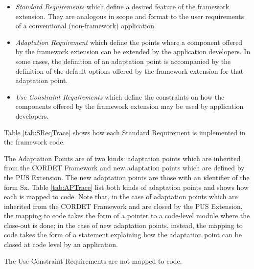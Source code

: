 \documentclass{pnp_article}
\begin{document}
\begin{itemize}
\item{} \textit{Standard Requirements} which define a desired feature of the framework extension. They are analogous in scope and format to the user requirements of a conventional (non-framework) application.
\item{} \textit{Adaptation Requirement} which define the points where a component offered by the framework extension can be extended by the application developers. In some cases, the definition of an adaptation point is accompanied by the definition of the default options offered by the framework extension for that adaptation point.  
\item{} \textit{Use Constraint Requirements} which define the constraints on how the components offered by the framework extension may be used by application developers.
\end{itemize}

Table \ref{tab:SReqTrace} shows how each Standard Requirement is implemented in the framework code. 

The Adaptation Points are of two kinds: adaptation points which are inherited from the CORDET Framework and new adaptation points which are defined by the PUS Extension. The new adaptation points are those with an identifier of the form Sx. Table \ref{tab:APTrace} list both kinds of adaptation points and shows how each is mapped to code. Note that, in the case of adaptation points which are inherited from the CORDET Framework and are closed by the PUS Extension, the mapping to code takes the form of a pointer to a code-level module where the close-out is done; in the case of new adaptation points, instead, the mapping to code takes the form of a statement explaining how the adaptation point can be closed at code level by an application.

The Use Constraint Requirements are not mapped to code. 


\begin{landscape}

\newpage

\newpage
{}


\end{landscape}
\end{document}
